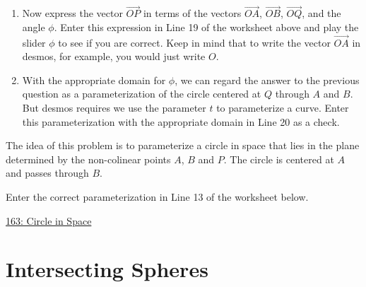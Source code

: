 \documentclass{ximera}
\begin{document}
\begin{question}
\begin{enumerate}
\begin{enumerate}
\end{enumerate}

\item{Now express the vector $\overrightarrow{OP}$ in terms of the vectors $\overrightarrow{OA}$, $\overrightarrow{OB}$, $\overrightarrow{OQ}$, and the angle $\phi$. Enter this expression in Line 19 of the worksheet above and play the slider $\phi$ to see if you are correct. Keep in mind that to write the vector $\overrightarrow{OA}$ in desmos, for example, you would just write $O$.
}

\item{With the appropriate domain for $\phi$, we can regard the answer to the previous question as a parameterization of the circle centered at $Q$ through $A$ and $B$. But desmos requires we use the parameter $t$ to parameterize a curve. Enter this parameterization with the appropriate domain in Line 20 as a check.}

\end{enumerate} 

\end{question}


\begin{question}  \label{Q9df43r23rfddfs}
The idea of this problem is to parameterize a circle in space that lies in the plane determined by the non-colinear points $A$, $B$ and $P$. The circle is centered at $A$ and passes through $B$.

Enter the correct parameterization in Line 13 of the worksheet below.


\begin{onlineOnly}
    \begin{center}
\end{center}
\end{onlineOnly}

\href{https://www.desmos.com/3d/4qvuqtp4lo}{163: Circle in Space}

\end{question}




\section{Intersecting Spheres}
\end{document}
